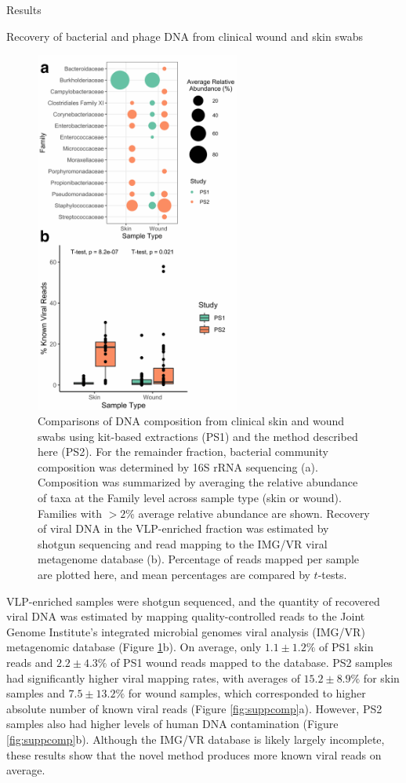 \documentclass[oneside,12pt,final]{sty/ucthesis-CA2012}
\begin{document}
\begin{mainmatter}
\begin{section}{Results}
\begin{subsection}{Recovery of bacterial and phage DNA from clinical wound and skin swabs}
\begin{figure}
\centering
\includegraphics[width=0.6\textwidth]{fig/C2fig7AB.pdf}
\caption{Comparisons of DNA composition from clinical skin and wound swabs using kit-based extractions (PS1) and the method described here (PS2). For the remainder fraction, bacterial community composition was determined by 16S rRNA sequencing (a). Composition was summarized by averaging the relative abundance of taxa at the Family level across sample type (skin or wound). Families with $> 2$\% average relative abundance are shown. Recovery of viral DNA in the VLP-enriched fraction was estimated by shotgun sequencing and read mapping to the IMG/VR viral metagenome database (b). Percentage of reads mapped per sample are plotted here, and mean percentages are compared by $t$-tests.}
\label{fig:clinical}
\end{figure}

VLP-enriched samples were shotgun sequenced, and the quantity of recovered viral DNA was estimated by mapping quality-controlled reads to the Joint Genome Institute’s integrated microbial genomes viral analysis (IMG/VR) metagenomic database (Figure \ref{fig:clinical}b). On average, only $1.1 \pm 1.2\%$ of PS1 skin reads and $2.2 \pm 4.3\%$ of PS1 wound reads mapped to the database. PS2 samples had significantly higher viral mapping rates, with averages of $15.2 \pm 8.9\%$ for skin samples and $7.5 \pm 13.2\%$ for wound samples, which corresponded to higher absolute number of known viral reads (Figure \ref{fig:suppcomp}a). However, PS2 samples also had higher levels of human DNA contamination (Figure \ref{fig:suppcomp}b). Although the IMG/VR database is likely largely incomplete, these results show that the novel method produces more known viral reads on average.


\end{subsection}
\end{section}
\end{mainmatter}
\end{document}
